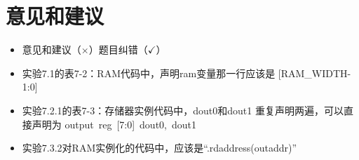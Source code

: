 \documentclass[12pt,a4paper,UTF8]{article}
\begin{document}
\section{意见和建议}
\begin{itemize}
  \item 意见和建议（$\times$）题目纠错（$\checkmark$）
  \item 实验7.1的表7-2：RAM代码中，声明ram变量那一行应该是
        \mbox{[RAM\_WIDTH-1:0]}
  \item 实验7.2.1的表7-3：存储器实例代码中，dout0和dout1
        重复声明两遍，可以直接声明为
        \mbox{output reg [7:0] dout0, dout1}
  \item 实验7.3.2对RAM实例化的代码中，应该是``.rdaddress(outaddr)''
\end{itemize}
\end{document}

